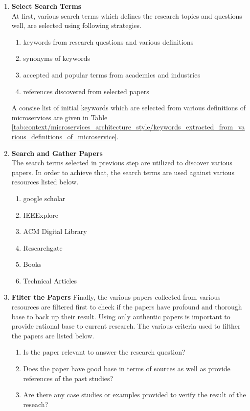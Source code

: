 \begin{enumerate}
\item \textbf{Select Search Terms}\\
At first, various search terms which defines the research topics and questions well, are selected using following strategies.
\begin{enumerate}
\item keywords from research questions and various definitions
\item synonyms of keywords
\item accepted and popular terms from academics and industries
\item references discovered from selected papers
\end{enumerate}
A consise list of initial keywords which are selected from various definitions of microservices are given in Table \ref{tab:context/microservices_architecture_style/keywords_extracted_from_various_definitions_of_microservice}.
\item \textbf{Search and Gather Papers}\\
The search terms selected in previous step are utilized to discover various papers. In order to achieve that, the search terms are used against various resources listed below.
\begin{enumerate}
\item google scholar
\item IEEExplore
\item ACM Digital Library
\item Researchgate
\item Books
\item Technical Articles
\end{enumerate}
\item \textbf{Filter the Papers}
Finally, the various papers collected from various resources are filtered first to check if the papers have profound and thorough base to back up their result. Using only authentic papers is important to provide rational base to current research. The various criteria used to filther the papers are listed below.
\begin{enumerate}
\item Is the paper relevant to answer the research question?
\item Does the paper have good base in terms of sources as well as provide references of the past studies? 
\item Are there any case studies or examples provided to verify the result of the reseach?
\end{enumerate}
\end{enumerate}

